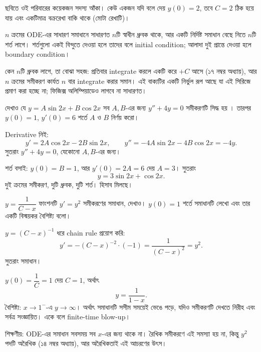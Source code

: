 \documentclass[11pt]{article}
\begin{document}
\begin{center}
\end{center}

ছবিতে ওই পরিবারের কয়েকজন সদস্য আঁকা। কেউ একজন যদি বলে দেয় $y(0) = 2$, তবে
$C = 2$ ঠিক হয়ে যায় এবং একটিমাত্র বক্ররেখা বাকি থাকে (মোটা রেখাটি)।

\begin{idea}[সাধারণ ও বিশেষ সমাধান]
$n$ ক্রমের ODE-এর সাধারণ সমাধানে সাধারণত $n$টি স্বাধীন ধ্রুবক থাকে, আর একটি
নির্দিষ্ট সমাধান বেছে নিতে $n$টি শর্ত লাগে। শর্তগুলো একই বিন্দুতে দেওয়া হলে
তাদের বলে initial condition; আলাদা দুই প্রান্তে দেওয়া হলে boundary condition।
\end{idea}

কেন $n$টি ধ্রুবক লাগে, তা বোঝা সহজ: প্রতিবার integrate করলে একটি করে
$+C$ আসে (১৭ নম্বর অধ্যায়), আর $n$ ক্রমের সমীকরণ কার্যত $n$ বার integrate
করার সমান। এই বাক্যটির একটি নির্ভুল রূপ আছে যা
এই সিরিজে প্রমাণ করা হচ্ছে না; ফিজিক্স অলিম্পিয়াডেও লাগবে না সাধারণত। 

\begin{example}
দেখাও যে $y = A\sin 2x + B\cos 2x$ সব $A, B$-এর জন্য $y'' + 4y = 0$
সমীকরণটি সিদ্ধ হয় । তারপর $y(0) = 1$, $y'(0) = 6$ শর্তে $A$ ও $B$ নির্ণয় করো।
\end{example}

\begin{solbox}
Derivative নিই:
\[
  y' = 2A\cos 2x - 2B\sin 2x, \qquad
  y'' = -4A\sin 2x - 4B\cos 2x = -4y .
\]
সুতরাং $y'' + 4y = 0$, যেকোনো $A, B$-এর জন্য।

শর্ত বসাই: $y(0) = B = 1$, আর $y'(0) = 2A = 6$ দেয় $A = 3$। সুতরাং
\[
  y = 3\sin 2x + \cos 2x .
\]
দুই ক্রমের সমীকরণ, দুটি ধ্রুবক, দুটি শর্ত। হিসাব মিলছে।
\end{solbox}

 $y = \dfrac{1}{C-x}$ ফাংশনটি $y' = y^{2}$ সমীকরণের সমাধান, দেখাও।
$y(0) = 1$ শর্তে সমাধানটি লেখো এবং তার একটি বিস্ময়কর বৈশিষ্ট্য বলো।

\begin{sol}
$y = (C-x)^{-1}$ ধরে chain rule প্রয়োগ করি:
\[
  y' = -(C-x)^{-2} \cdot (-1) = \frac{1}{(C-x)^{2}} = y^{2} .
\]
সুতরাং সমাধান।

$y(0) = \dfrac{1}{C} = 1$ দেয় $C = 1$, অর্থাৎ
\[
  y = \frac{1}{1-x} .
\]
বৈশিষ্ট্য: $x \to 1^{-}$-এ $y \to \infty$। অর্থাৎ সমাধানটি সসীম সময়েই ভেঙে
পড়ে, যদিও সমীকরণটি দেখতে নিরীহ এবং সর্বত্র সংজ্ঞায়িত। একে বলে finite-time
blow-up।

শিক্ষণীয়: ODE-এর সমাধান সবসময় সব $x$-এর জন্য থাকে না। রৈখিক সমীকরণে এই
সমস্যা হয় না, কিন্তু $y^{2}$ পদটি অরৈখিক (১৪ নম্বর অধ্যায়), আর
অরৈখিকতাই এই আচরণের উৎস।
\end{sol}
\end{document}
